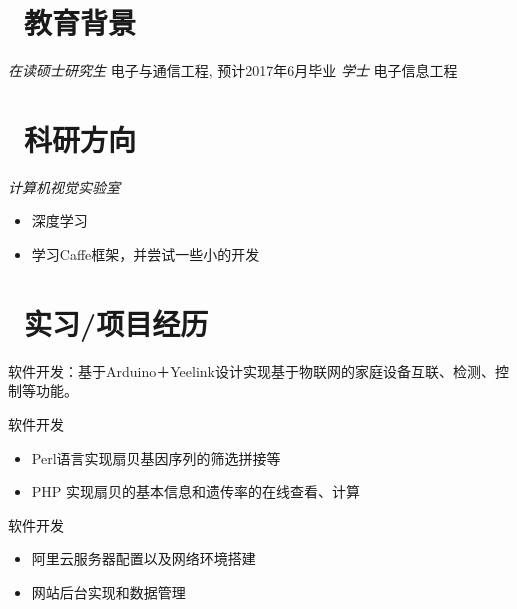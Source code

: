 \documentclass{resume}
\begin{document}


 
\section{\faGraduationCap\ 教育背景}
\textit{在读硕士研究生} 电子与通信工程, 预计2017年6月毕业
\textit{学士} 电子信息工程

\section{\faBook \ 科研方向}
\textit{计算机视觉实验室}  
\begin{itemize}
  \item 深度学习
  \item 学习Caffe框架，并尝试一些小的开发
\end{itemize}

\section{\faUsers\ 实习/项目经历}
软件开发：基于Arduino＋Yeelink设计实现基于物联网的家庭设备互联、检测、控制等功能。

软件开发
\begin{itemize}
  \item Perl语言实现扇贝基因序列的筛选拼接等
  \item PHP 实现扇贝的基本信息和遗传率的在线查看、计算
\end{itemize}

 软件开发
\begin{itemize}
  \item 阿里云服务器配置以及网络环境搭建
  \item 网站后台实现和数据管理
\end{itemize}
\end{document}
